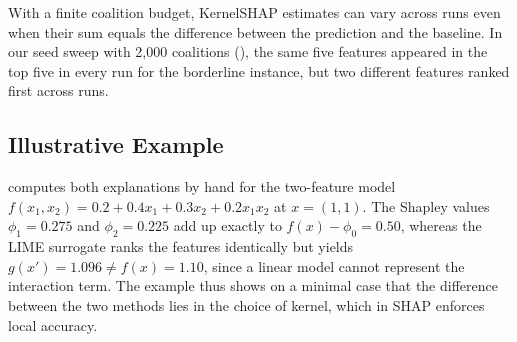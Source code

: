     With a finite coalition budget, KernelSHAP estimates can vary across runs even when their sum equals the difference between the prediction and the baseline. In our seed sweep with 2,000 coalitions (), the same five features appeared in the top five in every run for the borderline instance, but two different features ranked first across runs.

    \subsection{Illustrative Example}
    \label{sec:worked-examples}

     computes both explanations by hand for the two-feature model $f(x_1, x_2) = 0.2 + 0.4 x_1 + 0.3 x_2 + 0.2 x_1 x_2$ at $x = (1, 1)$. The Shapley values $\phi_1 = 0.275$ and $\phi_2 = 0.225$ add up exactly to $f(x) - \phi_0 = 0.50$, whereas the LIME surrogate ranks the features identically but yields $g(x') = 1.096 \neq f(x) = 1.10$, since a linear model cannot represent the interaction term. The example thus shows on a minimal case that the difference between the two methods lies in the choice of kernel, which in SHAP enforces local accuracy.

